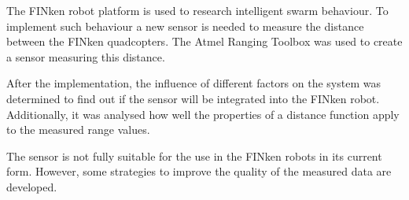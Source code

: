 
The FINken robot platform is used to research intelligent swarm behaviour.
To implement such behaviour a new sensor is needed to measure the distance between the FINken quadcopters.
The Atmel Ranging Toolbox was used to create a sensor measuring this distance.

After the implementation, the influence of different factors on the system was determined to find out if the sensor will be integrated into the FINken robot.
Additionally, it was analysed how well the properties of a distance function apply to the measured range values.

The sensor is not fully suitable for the use in the FINken robots in its current form.
However, some strategies to improve the quality of the measured data are developed.
